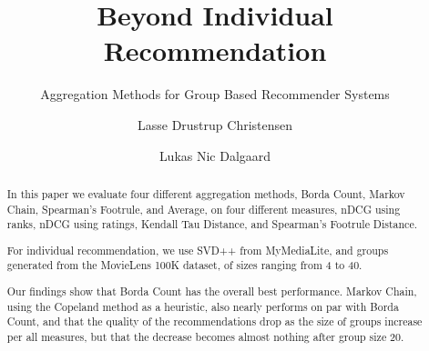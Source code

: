 \documentclass[sigplan]{acmart}
\begin{document}
\title{Beyond Individual Recommendation}
\subtitle{Aggregation Methods for Group Based Recommender Systems}

\author{Lasse Drustrup Christensen}

\author{Lukas Nic Dalgaard}



\begin{abstract}
In this paper we evaluate four different aggregation methods, Borda Count, Markov Chain, Spearman's Footrule, and Average, on four different measures, nDCG using ranks, nDCG using ratings, Kendall Tau Distance, and Spearman's Footrule Distance.
	
For individual recommendation, we use SVD++ from MyMediaLite, and groups generated from the MovieLens 100K dataset, of sizes ranging from 4 to 40.
	
Our findings show that Borda Count has the overall best performance. Markov Chain, using the Copeland method as a heuristic, also nearly performs on par with Borda Count, and that the quality of the recommendations drop as the size of groups increase per all measures, but that the decrease becomes almost nothing after group size 20.
%
\end{abstract}
\end{document}
